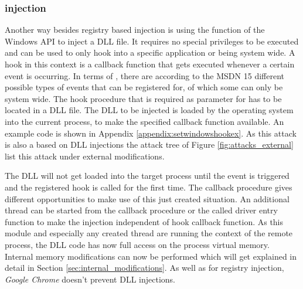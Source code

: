 \subsubsection{ injection}
Another way besides registry based injection is using the  function of the Windows API to inject a DLL file. It requires no special privileges to be executed and can be used to only hook into a specific application or being system wide. A hook in this context is a callback function that gets executed whenever a certain event is occurring. In terms of , there are according to the MSDN \cite{msdn_setwindowshookex} 15 different possible types of events that can be registered for, of which some can only be system wide. The hook procedure that is required as parameter for  has to be located in a DLL file. The DLL to be injected is loaded by the operating system into the current process, to make the specified callback function available. An example code is shown in Appendix \ref{appendix:setwindowshookex}. As this attack is also a based on DLL injections the attack tree of Figure \ref{fig:attacks_external} list this attack under external modifications. 

The DLL will not get loaded into the target process until the event is triggered and the registered hook is called for the first time. The callback procedure gives different opportunities to make use of this just created situation. An additional thread can be started from the callback procedure or the called driver entry function to make the injection independent of hook callback function. As this module and especially any created thread are running the context of the remote process, the DLL code has now full access on the process virtual memory. Internal memory modifications can now be performed which will get explained in detail in Section \ref{sec:internal_modifications}. As well as for registry injection, \emph{Google Chrome} doesn't prevent  DLL injections.